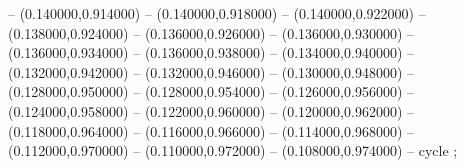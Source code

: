 -- (0.140000,0.914000) -- (0.140000,0.918000) -- (0.140000,0.922000) -- (0.138000,0.924000) -- (0.136000,0.926000) -- (0.136000,0.930000) -- (0.136000,0.934000) -- (0.136000,0.938000) -- (0.134000,0.940000) -- (0.132000,0.942000) -- (0.132000,0.946000) -- (0.130000,0.948000) -- (0.128000,0.950000) -- (0.128000,0.954000) -- (0.126000,0.956000) -- (0.124000,0.958000) -- (0.122000,0.960000) -- (0.120000,0.962000) -- (0.118000,0.964000) -- (0.116000,0.966000) -- (0.114000,0.968000) -- (0.112000,0.970000) -- (0.110000,0.972000) -- (0.108000,0.974000) -- cycle
   ;
